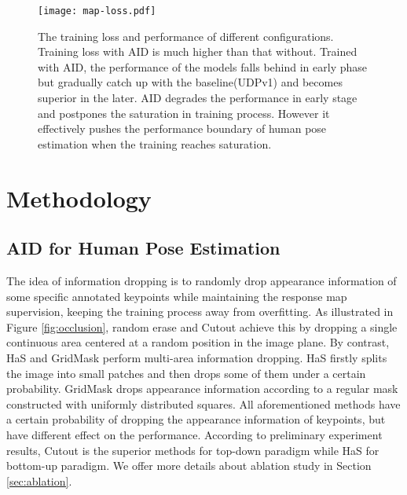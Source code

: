 \documentclass[final]{cvpr}
\begin{document}
\begin{figure*}[t]
	\setlength{\abovecaptionskip}{0.cm}
    \begin{center}
        \texttt{[image: map-loss.pdf]}
    \end{center}
   \caption{The training loss and performance of different configurations. Training loss with AID is much higher than that without. Trained with AID, the performance of the models falls behind in early phase but gradually catch up with the baseline(UDPv1) and becomes superior in the later. AID degrades the performance in early stage and postpones the saturation in training process. However it effectively pushes the performance boundary of human pose estimation when the training reaches saturation.  }
    \label{fig:map}

\end{figure*}


\section{Methodology}
\label{sec:MT}
\subsection{AID for Human Pose Estimation}
The idea of information dropping is to randomly drop appearance information of some specific annotated keypoints while maintaining the response map supervision, keeping the training process away from overfitting. As illustrated in Figure \ref{fig:occlusion}, random erase \cite{REDA} and Cutout \cite{Cutout} achieve this by dropping a single continuous area centered at a random position in the image plane. By contrast, HaS \cite{HaS} and GridMask \cite{GridMask} perform multi-area information dropping. HaS firstly splits the image into small patches and then drops some of them under a certain probability. GridMask drops appearance information according to a regular mask constructed with uniformly distributed squares. All aforementioned methods have a certain probability of dropping the appearance information of keypoints, but have different effect on the performance. According to preliminary experiment results, Cutout is the superior methods for top-down paradigm while HaS for bottom-up paradigm. We offer more details about ablation study in Section \ref{sec:ablation}.
\end{document}
